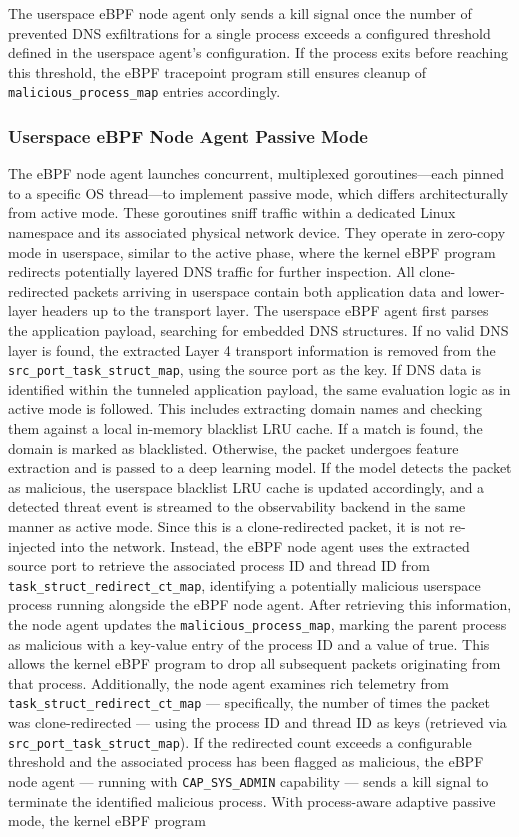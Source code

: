 \documentclass [11pt, proquest] {uwthesis}[2020/02/24]
\begin{document}
The userspace eBPF node agent only sends a kill signal once the number of prevented DNS exfiltrations for a single process exceeds a configured threshold defined in the userspace agent’s configuration. If the process exits before reaching this threshold, the eBPF tracepoint program still ensures cleanup of \texttt{malicious\_process\_map} entries accordingly.

\subsubsection{\textbf{Userspace eBPF Node Agent Passive Mode}}
\label{passive:sec2}
The eBPF node agent launches concurrent, multiplexed goroutines—each pinned to a specific OS thread—to implement passive mode, which differs architecturally from active mode. These goroutines sniff traffic within a dedicated Linux namespace and its associated physical network device. They operate in zero-copy mode in userspace, similar to the active phase, where the kernel eBPF program redirects potentially layered DNS traffic for further inspection. All clone-redirected packets arriving in userspace contain both application data and lower-layer headers up to the transport layer. The userspace eBPF agent first parses the application payload, searching for embedded DNS structures. If no valid DNS layer is found, the extracted Layer 4 transport information is removed from the \texttt{src\_port\_task\_struct\_map}, using the source port as the key. If DNS data is identified within the tunneled application payload, the same evaluation logic as in active mode is followed. This includes extracting domain names and checking them against a local in-memory blacklist LRU cache. If a match is found, the domain is marked as blacklisted. Otherwise, the packet undergoes feature extraction and is passed to a deep learning model. If the model detects the packet as malicious, the userspace blacklist LRU cache is updated accordingly, and a detected threat event is streamed to the observability backend in the same manner as active mode. Since this is a clone-redirected packet, it is not re-injected into the network. Instead, the eBPF node agent uses the extracted source port to retrieve the associated process ID and thread ID from \texttt{task\_struct\_redirect\_ct\_map}, identifying a potentially malicious userspace process running alongside the eBPF node agent. After retrieving this information, the node agent updates the \texttt{malicious\_process\_map}, marking the parent process as malicious with a key-value entry of the process ID and a value of true. This allows the kernel eBPF program to drop all subsequent packets originating from that process. Additionally, the node agent examines rich telemetry from \texttt{task\_struct\_redirect\_ct\_map} — specifically, the number of times the packet was clone-redirected — using the process ID and thread ID as keys (retrieved via \texttt{src\_port\_task\_struct\_map}). If the redirected count exceeds a configurable threshold and the associated process has been flagged as malicious, the eBPF node agent — running with \texttt{CAP\_SYS\_ADMIN} capability — sends a kill signal to terminate the identified malicious process. With process-aware adaptive passive mode, the kernel eBPF program 
\end{document}
